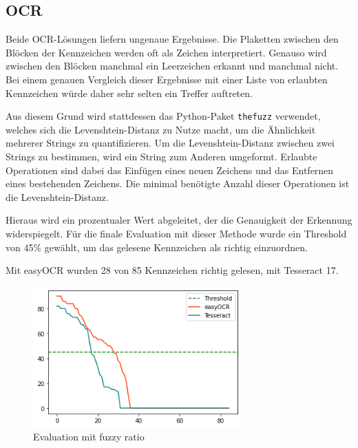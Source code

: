 \subsection{OCR}
Beide OCR-Lösungen liefern ungenaue Ergebnisse. Die Plaketten zwischen den Blöcken der Kennzeichen werden oft als Zeichen interpretiert. Genauso wird zwischen den Blöcken manchmal ein Leerzeichen erkannt und manchmal nicht.
Bei einem genauen Vergleich dieser Ergebnisse mit einer Liste von erlaubten Kennzeichen würde daher sehr selten ein Treffer auftreten.

Aus diesem Grund wird stattdessen das Python-Paket \lstinline{thefuzz} verwendet, welches sich die Levenshtein-Distanz zu Nutze macht, um die Ähnlichkeit mehrerer Strings zu quantifizieren.
Um die Levenshtein-Distanz zwischen zwei Strings zu bestimmen, wird ein String zum Anderen umgeformt. Erlaubte Operationen sind dabei das Einfügen eines neuen Zeichens und das Entfernen eines bestehenden Zeichens.
Die minimal benötigte Anzahl dieser Operationen ist die Levenshtein-Distanz.

Hieraus wird ein prozentualer Wert abgeleitet, der die Genauigkeit der Erkennung widerspiegelt.
Für die finale Evaluation mit dieser Methode wurde ein Threshold von 45\% gewählt, um das gelesene Kennzeichen als richtig einzuordnen.

Mit easyOCR wurden 28 von 85 Kennzeichen richtig gelesen, mit Tesseract 17.
\begin{figure}[H]
		\centering
\includegraphics[width=8cm]{./img/evaluation_fuzzy_ratio.png}
\caption{Evaluation mit fuzzy ratio}
\end{figure}

